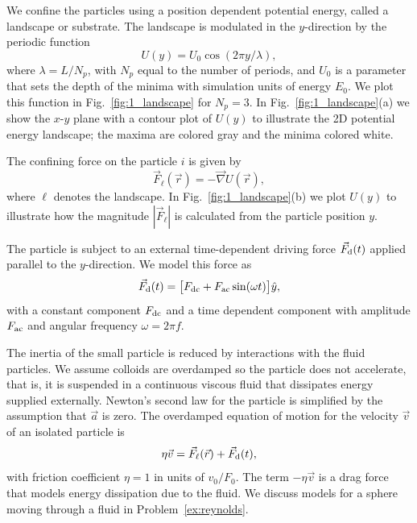\documentclass[preprint,showpacs,preprintnumbers,amsmath,amssymb,aps,prb]{revtex4-1}
\theoremstyle{remark}
\begin{document}
We confine the particles using a position dependent 
potential energy, called a landscape or substrate.
The landscape is modulated in the $y$-direction
by the periodic function 
 \begin{equation}
   U(y) = U_0 \cos{(2 \pi y / \lambda)},
     \label{eq:ysubstrate}
\end{equation}
where $\lambda=L/N_p$, with $N_p$ equal to the number of periods,
and $U_0$ is a parameter
 that sets the depth of the minima
 with simulation units of energy $E_0$. 
 We plot this function in 
 Fig.~\ref{fig:1_landscape}
 for $N_p = 3$.  In Fig.~\ref{fig:1_landscape}(a) we show 
 the $x$-$y$ plane with a contour plot of $U(y)$ 
 to illustrate
 the 2D potential energy landscape;
 the maxima are colored gray and the minima colored white.

The confining force on the particle $i$
 is given by
 \begin{equation}
 \vec{F}_{\ell}(\vec{r}) = - \vec \nabla U(\vec{r}),
 \label{eq:dudr}
 \end{equation}
where $\ell$ denotes the landscape.
 In Fig.~\ref{fig:1_landscape}(b) we plot  
 $U(y)$ to illustrate how the magnitude
 $|\vec{F}_{\ell}|$ is calculated from the particle position $y$.
 
The particle is subject to an external time-dependent driving force
$\vec{F}_{\rm d}(t)$
applied parallel to the $y$-direction.
We model this force as
\begin{equation}
  \vec{F}_{\rm d}(t) = \big [F_{\rm dc} + F_{\rm ac} \sin(\omega t)\big] \hat{y},
    \label{eq:drive}
\end{equation}
with 
a constant component $F_{\rm dc}$
and a time dependent component with amplitude $F_{\rm ac}$
and angular frequency $\omega = 2 \pi f$.

The inertia of the 
small particle is reduced by interactions
with the fluid particles.\cite{Purcell1977}
We assume 
colloids are
overdamped
so the particle does not accelerate,
that is, it is suspended in a continuous viscous fluid
that dissipates energy supplied externally. 
Newton's second law for the particle
is simplified
by the assumption that $\vec{a}$ is zero. 
The overdamped equation of motion for
the velocity $\vec{v}$ of 
an isolated particle is
\begin{equation}
  \eta \vec{v} = \vec{F}_{\ell}(\vec{r}) + \vec{F}_{\rm d}(t),
    \label{eq:motion}
\end{equation}
with friction coefficient $\eta = 1$ in units of $v_0 / F_0$.
The term $-\eta \vec{v}$
is a drag force that models
energy dissipation due to the fluid. 
We discuss  models for
a sphere moving through a fluid in 
Problem~\ref{ex:reynolds}. 
\end{document}
